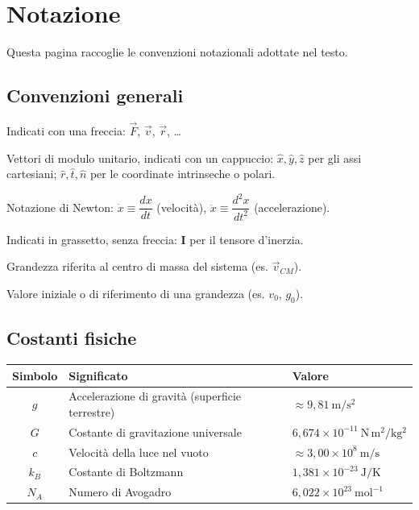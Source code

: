 \chapter*{Notazione}
\thispagestyle{empty}

Questa pagina raccoglie le convenzioni notazionali adottate nel testo.

\section*{Convenzioni generali}

\begin{description}[leftmargin=2.2cm, style=nextline]
  \item[Vettori] Indicati con una freccia: $\vec{F}$, $\vec{v}$, $\vec{r}$, \ldots
  \item[Versori] Vettori di modulo unitario, indicati con un cappuccio: $\hat{x}, \hat{y}, \hat{z}$ per gli assi cartesiani; $\hat{r}, \hat{t}, \hat{n}$ per le coordinate intrinseche o polari.
  \item[Derivate temporali] Notazione di Newton: $\dot{x} \equiv \dfrac{dx}{dt}$ (velocità), $\ddot{x} \equiv \dfrac{d^2x}{dt^2}$ (accelerazione).
  \item[Tensori] Indicati in grassetto, senza freccia: $\mathbf{I}$ per il tensore d'inerzia.
  \item[Pedice $_{CM}$] Grandezza riferita al centro di massa del sistema (es. $\vec{v}_{CM}$).
  \item[Pedice $_0$] Valore iniziale o di riferimento di una grandezza (es. $v_0$, $g_0$).
\end{description}

\section*{Costanti fisiche}

\begin{center}
\begin{tabular}{@{}cll@{}}
\toprule
\textbf{Simbolo} & \textbf{Significato} & \textbf{Valore} \\
\midrule
$g$     & Accelerazione di gravità (superficie terrestre) & $\approx 9{,}81\ \mathrm{m/s^2}$ \\
$G$     & Costante di gravitazione universale              & $6{,}674 \times 10^{-11}\ \mathrm{N\,m^2/kg^2}$ \\
$c$     & Velocità della luce nel vuoto                     & $\approx 3{,}00 \times 10^{8}\ \mathrm{m/s}$ \\
$k_B$   & Costante di Boltzmann                             & $1{,}381 \times 10^{-23}\ \mathrm{J/K}$ \\
$N_A$   & Numero di Avogadro                                & $6{,}022 \times 10^{23}\ \mathrm{mol^{-1}}$ \\
\bottomrule
\end{tabular}
\end{center}

